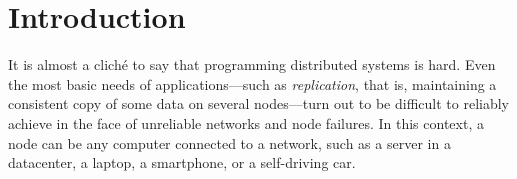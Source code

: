 \documentclass[acmlarge,review,anonymous]{acmart}\settopmatter{printfolios=true}
\begin{document}
\maketitle



\section{Introduction}
\label{sect.introduction}

It is almost a clich{\' e} to say that programming distributed systems is hard. Even the most basic
needs of applications---such as \emph{replication}, that is, maintaining a consistent copy of some
data on several nodes---turn out to be difficult to reliably achieve in the face of unreliable
networks and node failures. In this context, a node can be any computer connected to a network, such
as a server in a datacenter, a laptop, a smartphone, or a self-driving car.
\end{document}

